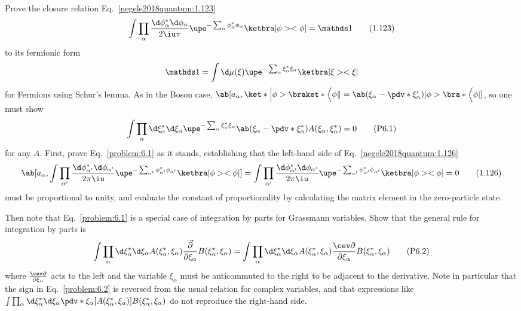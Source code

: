 \begin{problem}
  Prove the closure relation Eq.~\eqref{negele2018quantum:1.123}
  \begin{equation}
    \int \prod_\alpha \frac{\d\phi_\alpha^* \d\phi_\alpha}{2\iu\pi}
    \upe^{-\sum_\alpha \phi_\alpha^*\phi_\alpha} \ketbra|\phi><\phi| = \identity
    \tag{1.123}
  \end{equation}
  to its fermionic form
  \[
    \identity = \int \d\mu(\xi) \upe^{-\sum_\alpha \xi_\alpha^* \xi_\alpha}
    \ketbra|\xi><\xi|
  \]
  for Fermions using Schur's lemma. As in the Boson case, $\ab[a_\alpha,
  \ket*\Big|\phi>\braket*\Big<\phi \|= \ab(\xi_\alpha - \pdv*{}{\xi_\alpha'})|\phi>\bra*\Big<\phi|]$,
  so one must show
  \begin{equation}
    \int \prod_\alpha \d\xi_\alpha^* \d\xi_\alpha
    \upe^{-\sum_\alpha \xi_\alpha^* \xi_\alpha}
    \ab(\xi_\alpha - \pdv*{}{\xi_\alpha^*}) A(\xi_\alpha, \xi_\alpha^*) = 0
    \tag{P6.1} \label{problem:6.1}
  \end{equation}
  for any $A$. First, prove Eq.~\eqref{problem:6.1} as it stands, establishing
  that the left-hand side of Eq.~\eqref{negele2018quantum:1.126}
  \begin{equation}
    \ab[a_\alpha,
      \int\prod_{\alpha'} \frac{\d\phi_{\alpha'}^* \d\phi_{\alpha'}}{2\pi\iu}
      \upe^{-\sum_{\alpha'}\phi_{\alpha'}^*\phi_{\alpha'}} \ketbra|\phi><\phi|
    ] =
    \int\prod_{\alpha'} \frac{\d\phi_{\alpha'}^* \d\phi_{\alpha'}}{2\pi\iu}
      \upe^{-\sum_{\alpha'}\phi_{\alpha'}^*\phi_{\alpha'}} \ketbra|\phi><\phi|
    = 0
    \tag{1.126} \label{negele2018quantum:1.126}
  \end{equation}
  must be proportional to unity, and evaluate the constant of proportionality
  by calculating the matrix element in the zero-particle state.

  Then note that Eq.~\eqref{problem:6.1} is a special case of integration by parts for
  Grassmann variables. Show that the general rule for integration by parts is
  \begin{equation}
    \int \prod_\alpha \d\xi_\alpha^* \d\xi_\alpha A(\xi_\alpha^*,\xi_\alpha)
    \frac{\vec\partial}
      {\partial\xi_\alpha} B(\xi_\alpha^*, \xi_\alpha) =
    \int \prod_\alpha \d\xi_\alpha^* \d\xi_\alpha A(\xi_\alpha^*,\xi_\alpha)
    \frac{\cev\partial}{\partial\xi_\alpha} B(\xi_\alpha^*, \xi_\alpha)
    \tag{P6.2} \label{problem:6.2}
  \end{equation}
  where $\frac{\cev\partial}
    {\partial\xi_\alpha}$ acts to the left and the variable $\xi_\alpha$ must
  be anticommuted to the right to be adjacent to the derivative. Note in
  particular that the sign in Eq.~\eqref{problem:6.2} is reversed from the usual
  relation for complex variables, and that expressions like
  $\int \prod_\alpha \d\xi_\alpha^* \d\xi_\alpha \pdv*{}{\xi_\alpha}
    [A(\xi_\alpha^*, \xi_\alpha)] B(\xi_\alpha^*, \xi_\alpha)$ do not reproduce
  the right-hand side.
\end{problem}
